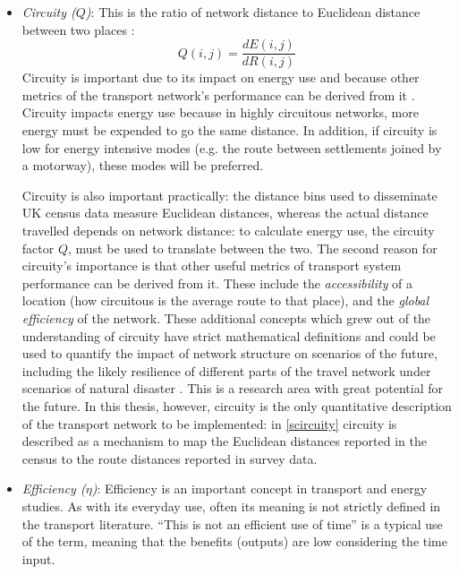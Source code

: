 \begin{itemize}
 \item \emph{Circuity ($Q$)}: This is the ratio of network distance to Euclidean
distance
between two places \citep{Levinson2009}:
\begin{equation}
 Q(i,j) = \frac{dE(i,j)}{dR(i,j)}
\end{equation}
Circuity is important due to its impact on energy use \citep{Levinson2012}
and because other metrics of the transport network's performance can be
derived from it \citep{Barthelemy2011}.
Circuity impacts energy use because in highly circuitous
networks, more energy must be expended to go the same distance. In addition,
if circuity is low for energy intensive modes (e.g. the route
between settlements joined by a motorway), these modes will be preferred.

Circuity is also important practically:
the distance bins used to disseminate UK census data measure Euclidean distances,
whereas the actual distance travelled depends on network distance: to
calculate energy use, the circuity factor $Q$, must be used to translate
between the two. The second reason for circuity's importance
is that other useful metrics of transport system performance can be derived from
it. These  include the \emph{accessibility} of a location
 (how circuitous is the average route to that place), and the
\emph{global efficiency} of the network. These additional concepts
which grew out of the understanding of circuity have strict mathematical
definitions and could be used to quantify the impact of network
structure on scenarios of the future, including the likely resilience of
different parts of the travel network under scenarios of natural disaster
\citet{Barthelemy2011}. This is a research area with great potential for
the future. In this thesis, however, circuity is the only quantitative
description of the transport network to be implemented: in \ref{scircuity}
circuity is described as a mechanism to map the Euclidean
distances reported in the census to the route distances reported in survey data.

\item \emph{Efficiency ($\eta$)}: Efficiency is an important concept in
transport and energy studies. As with its everyday use, often its meaning
is not strictly defined in the transport literature. ``This is not an
efficient use of time'' is a typical use of the term, meaning that the
benefits (outputs) are low considering the time input. 


\end{itemize}

